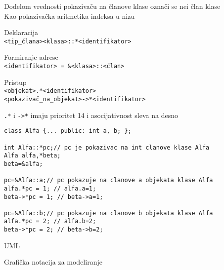 \documentclass{article}
\newenvironment{xitemize}{%
    
    \itemize
    \larger
}{%
    \enditemize
}
\let\olditemize\itemize
\let\endolditemize\enditemize
\renewenvironment{itemize}{%
    \smaller
    \olditemize
}{%
    \endolditemize
}
\providecommand{\inlinecode}[1]{\texttt{#1}}
\begin{document}
\begin{xitemize}
\begin{itemize}
    \item Dodelom vrednosti pokazivaču na članove klase označi se nei član klase\\
    Kao pokazivačka aritmetika indeksa u nizu
    \item Deklaracija\\
    \inlinecode{<tip\_člana><klasa>::*<identifikator>}
    \item Formiranje adrese\\
    \inlinecode{<identifikator> = \&<klasa>::<član>}
    \item Pristup\\
    \inlinecode{<objekat>.*<identifikator>}\\
    \inlinecode{<pokazivač\_na\_objekat>->*<identifikator>}
    \item \inlinecode{.*} i \inlinecode{->*} imaju prioritet 14 i asocijativnost sleva na desno
    \begin{lstlisting}
class Alfa {... public: int a, b; };

int Alfa::*pc;// pc je pokazivac na int clanove klase Alfa
Alfa alfa,*beta;
beta=&alfa;

pc=&Alfa::a;// pc pokazuje na clanove a objekata klase Alfa
alfa.*pc = 1; // alfa.a=1;
beta->*pc = 1; // beta->a=1;

pc=&Alfa::b;// pc pokazuje na clanove b objekata klase Alfa
alfa.*pc = 2; // alfa.b=2;
beta->*pc = 2; // beta->b=2;
    \end{lstlisting}
\end{itemize}
\item UML
\begin{itemize}
    \item Grafička notacija za modeliranje\\\\
    \begin{figure}[h]
\end{figure}
\end{itemize}
\end{xitemize}
\end{document}
